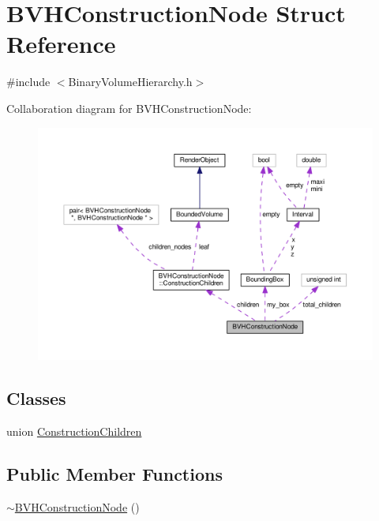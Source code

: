 \hypertarget{structBVHConstructionNode}{}\section{B\+V\+H\+Construction\+Node Struct Reference}
\label{structBVHConstructionNode}


{\ttfamily \#include $<$Binary\+Volume\+Hierarchy.\+h$>$}



Collaboration diagram for B\+V\+H\+Construction\+Node\+:\nopagebreak
\begin{figure}[H]
\begin{center}
\leavevmode
\includegraphics[width=350pt]{structBVHConstructionNode__coll__graph}
\end{center}
\end{figure}
\subsection*{Classes}
\begin{DoxyCompactItemize}
\item 
union \hyperlink{unionBVHConstructionNode_1_1ConstructionChildren}{Construction\+Children}
\end{DoxyCompactItemize}
\subsection*{Public Member Functions}
\begin{DoxyCompactItemize}
\item 
\hyperlink{structBVHConstructionNode_af28961a656f19c0a72ad44c69db2b01d}{$\sim$\+B\+V\+H\+Construction\+Node} ()
\end{DoxyCompactItemize}

